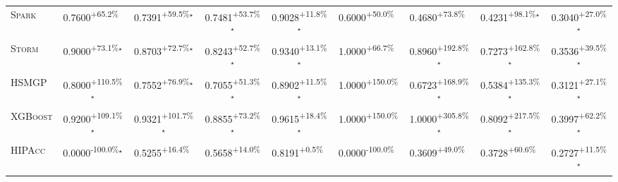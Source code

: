 \begin{table}[htbp]
\begin{tabular}{l|cccc|cccc}
\textsc{Spark} & \cellcolor{green!30}0.7600\textsuperscript{+65.2\%}$^{\,\,\,}$ & \cellcolor{green!30}0.7391\textsuperscript{+59.5\%}$^\star$ & \cellcolor{green!30}0.7481\textsuperscript{+53.7\%}$^\star$ & \cellcolor{green!30}0.9028\textsuperscript{+11.8\%}$^\star$ & \cellcolor{green!30}0.6000\textsuperscript{+50.0\%}$^{\,\,\,}$ & \cellcolor{green!30}0.4680\textsuperscript{+73.8\%}$^{\,\,\,}$ & \cellcolor{green!30}0.4231\textsuperscript{+98.1\%}$^\star$ & \cellcolor{green!30}0.3040\textsuperscript{+27.0\%}$^\star$ \\
\textsc{Storm} & \cellcolor{green!30}0.9000\textsuperscript{+73.1\%}$^\star$ & \cellcolor{green!30}0.8703\textsuperscript{+72.7\%}$^\star$ & \cellcolor{green!30}0.8243\textsuperscript{+52.7\%}$^\star$ & \cellcolor{green!30}0.9340\textsuperscript{+13.1\%}$^\star$ & \cellcolor{green!30}1.0000\textsuperscript{+66.7\%}$^{\,\,\,}$ & \cellcolor{green!30}0.8960\textsuperscript{+192.8\%}$^\star$ & \cellcolor{green!30}0.7273\textsuperscript{+162.8\%}$^\star$ & \cellcolor{green!30}0.3536\textsuperscript{+39.5\%}$^\star$ \\
\textsc{HSMGP} & \cellcolor{green!30}0.8000\textsuperscript{+110.5\%}$^\star$ & \cellcolor{green!30}0.7552\textsuperscript{+76.9\%}$^\star$ & \cellcolor{green!30}0.7055\textsuperscript{+51.3\%}$^\star$ & \cellcolor{green!30}0.8902\textsuperscript{+11.5\%}$^\star$ & \cellcolor{green!30}1.0000\textsuperscript{+150.0\%}$^{\,\,\,}$ & \cellcolor{green!30}0.6723\textsuperscript{+168.9\%}$^\star$ & \cellcolor{green!30}0.5384\textsuperscript{+135.3\%}$^\star$ & \cellcolor{green!30}0.3121\textsuperscript{+27.1\%}$^\star$ \\
\textsc{XGBoost} & \cellcolor{green!30}0.9200\textsuperscript{+109.1\%}$^\star$ & \cellcolor{green!30}0.9321\textsuperscript{+101.7\%}$^\star$ & \cellcolor{green!30}0.8855\textsuperscript{+73.2\%}$^\star$ & \cellcolor{green!30}0.9615\textsuperscript{+18.4\%}$^\star$ & \cellcolor{green!30}1.0000\textsuperscript{+150.0\%}$^{\,\,\,}$ & \cellcolor{green!30}1.0000\textsuperscript{+305.8\%}$^\star$ & \cellcolor{green!30}0.8092\textsuperscript{+217.5\%}$^\star$ & \cellcolor{green!30}0.3997\textsuperscript{+62.2\%}$^\star$ \\
\textsc{HIPAcc} & \cellcolor{red!30}0.0000\textsuperscript{-100.0\%}$^\star$ & \cellcolor{green!30}0.5255\textsuperscript{+16.4\%}$^{\,\,\,}$ & \cellcolor{green!30}0.5658\textsuperscript{+14.0\%}$^{\,\,\,}$ & \cellcolor{green!30}0.8191\textsuperscript{+0.5\%}$^{\,\,\,}$ & \cellcolor{red!30}0.0000\textsuperscript{-100.0\%}$^{\,\,\,}$ & \cellcolor{green!30}0.3609\textsuperscript{+49.0\%}$^{\,\,\,}$ & \cellcolor{green!30}0.3728\textsuperscript{+60.6\%}$^{\,\,\,}$ & \cellcolor{green!30}0.2727\textsuperscript{+11.5\%}$^\star$ \\

\end{tabular}
\end{table}
